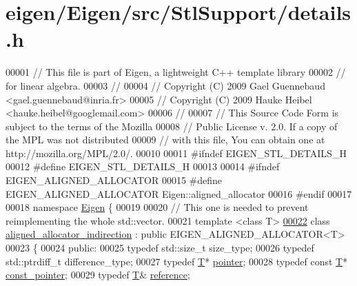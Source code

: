 \hypertarget{eigen_2_eigen_2src_2_stl_support_2details_8h_source}{}\section{eigen/\+Eigen/src/\+Stl\+Support/details.h}
\label{eigen_2_eigen_2src_2_stl_support_2details_8h_source}

\begin{DoxyCode}
00001 \textcolor{comment}{// This file is part of Eigen, a lightweight C++ template library}
00002 \textcolor{comment}{// for linear algebra.}
00003 \textcolor{comment}{//}
00004 \textcolor{comment}{// Copyright (C) 2009 Gael Guennebaud <gael.guennebaud@inria.fr>}
00005 \textcolor{comment}{// Copyright (C) 2009 Hauke Heibel <hauke.heibel@googlemail.com>}
00006 \textcolor{comment}{//}
00007 \textcolor{comment}{// This Source Code Form is subject to the terms of the Mozilla}
00008 \textcolor{comment}{// Public License v. 2.0. If a copy of the MPL was not distributed}
00009 \textcolor{comment}{// with this file, You can obtain one at http://mozilla.org/MPL/2.0/.}
00010 
00011 \textcolor{preprocessor}{#ifndef EIGEN\_STL\_DETAILS\_H}
00012 \textcolor{preprocessor}{#define EIGEN\_STL\_DETAILS\_H}
00013 
00014 \textcolor{preprocessor}{#ifndef EIGEN\_ALIGNED\_ALLOCATOR}
00015 \textcolor{preprocessor}{  #define EIGEN\_ALIGNED\_ALLOCATOR Eigen::aligned\_allocator}
00016 \textcolor{preprocessor}{#endif}
00017 
00018 \textcolor{keyword}{namespace }\hyperlink{namespace_eigen}{Eigen} \{
00019 
00020   \textcolor{comment}{// This one is needed to prevent reimplementing the whole std::vector.}
00021   \textcolor{keyword}{template} <\textcolor{keyword}{class} T>
\hyperlink{class_eigen_1_1aligned__allocator__indirection}{00022}   \textcolor{keyword}{class }\hyperlink{class_eigen_1_1aligned__allocator__indirection}{aligned\_allocator\_indirection} : \textcolor{keyword}{public} EIGEN\_ALIGNED\_ALLOCATOR<T>
00023   \{
00024   \textcolor{keyword}{public}:
00025     \textcolor{keyword}{typedef} std::size\_t     size\_type;
00026     \textcolor{keyword}{typedef} std::ptrdiff\_t  difference\_type;
00027     \textcolor{keyword}{typedef} \hyperlink{group___sparse_core___module}{T}*              \hyperlink{group___sparse_core___module}{pointer};
00028     \textcolor{keyword}{typedef} \textcolor{keyword}{const} \hyperlink{group___sparse_core___module}{T}*        \hyperlink{group___sparse_core___module}{const\_pointer};
00029     \textcolor{keyword}{typedef} \hyperlink{group___sparse_core___module}{T}&              \hyperlink{group___sparse_core___module}{reference};

\end{DoxyCode}
